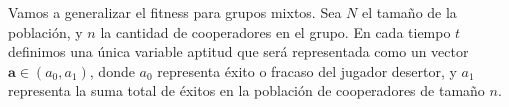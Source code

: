 \documentclass[a4paper,10pt]{article}
\begin{document}
Vamos a generalizar el fitness para grupos mixtos.
Sea $N$ el tamaño de la población, y $n$ la cantidad de cooperadores en el grupo.
En cada tiempo $t$ definimos una única variable aptitud que será representada como un vector $\bm{a} \in (a_0, a_1)$, donde $a_0$ representa éxito o fracaso del jugador desertor, y $a_1$ representa la suma total de éxitos en la población de cooperadores de tamaño $n$.
%     
%     
%     
%     
%     
% 

\end{document}
